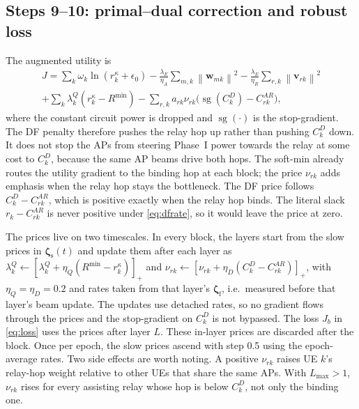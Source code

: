 \documentclass[conference]{IEEEtran}
\newcommand{\norm}[1]{\left\lVert #1 \right\rVert}
\newcommand{\sgn}{\operatorname{sg}}
\newcommand{\zs}{\boldsymbol{\zeta}_{\mathrm{s}}}
\newcommand{\zf}{\boldsymbol{\zeta}_{\mathrm{f}}}
\begin{document}
\subsection{Steps 9--10: primal--dual correction and robust loss}
\label{sec:robust}
The augmented utility is
\begin{multline}
J = \sum_k \omega_k \ln(r^\kappa_k+\epsilon_0) - \frac{\lambda_E}{\eta_A}
\sum_{m,k}\norm{\mathbf{w}_{mk}}^2 - \frac{\lambda_E}{\eta_R}
\sum_{r,k}\norm{\mathbf{v}_{rk}}^2 \\
+ \sum_k \lambda^Q_k (r^\kappa_k - R^{\min})
- \sum_{r,k} a_{rk}\nu_{rk}\bigl(\sgn(C^D_k) - C^{AR}_{rk}\bigr),
\label{eq:J}
\end{multline}
where the constant circuit power is dropped and $\sgn(\cdot)$ is the
stop-gradient. The DF penalty therefore pushes the relay hop up rather than
pushing $C^D_k$ down. It does not stop the APs from steering Phase~I power
towards the relay at some cost to $C^D_k$, because the same AP beams drive
both hops. The soft-min already routes the utility gradient to the binding
hop at each block; the price $\nu_{rk}$ adds emphasis when the relay hop
stays the bottleneck. The DF price follows $C^D_k - C^{AR}_{rk}$, which is
positive exactly when the relay hop binds. The literal slack
$r_k - C^{AR}_{rk}$ is never positive under \eqref{eq:dfrate}, so it would
leave the price at zero.

The prices live on two timescales. In every block, the layers start from the
slow prices in $\zs(t)$ and update them after each layer as
$\lambda^Q_k \leftarrow [\lambda^Q_k + \eta_Q (R^{\min}-r^\kappa_k)]_+$ and
$\nu_{rk} \leftarrow [\nu_{rk} + \eta_D (C^D_k - C^{AR}_{rk})]_+$, with
$\eta_Q=\eta_D=0.2$ and rates taken from that layer's $\zf$, i.e.\ measured
before that layer's beam update. The updates use detached rates, so no
gradient flows through the prices and the stop-gradient on $C^D_k$ is not
bypassed. The loss $J_b$ in \eqref{eq:loss} uses the prices after layer $L$.
These in-layer prices are discarded after the block. Once per epoch, the slow
prices ascend with step 0.5 using the epoch-average rates. Two side effects
are worth noting. A positive $\nu_{rk}$ raises UE $k$'s relay-hop weight
relative to other UEs that share the same APs. With $L_{\max}>1$, $\nu_{rk}$
rises for every assisting relay whose hop is below $C^D_k$, not only the
binding one.
\end{document}
